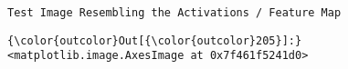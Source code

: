 \documentclass[11pt]{article}
\begin{document}
    \begin{Verbatim}[commandchars=\\\{\}]
Test Image Resembling the Activations / Feature Map

    \end{Verbatim}

\begin{Verbatim}[commandchars=\\\{\}]
{\color{outcolor}Out[{\color{outcolor}205}]:} <matplotlib.image.AxesImage at 0x7f461f5241d0>
\end{Verbatim}
            
    \begin{center}
    \end{center}
    { \hspace*{\fill} \\}
    

    
    
    
    
\end{document}
